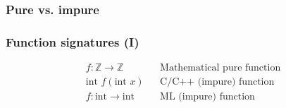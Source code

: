 \begin{frame}
  \frametitle{Pure vs. impure}
  \begin{center}
    \begin{figure}
    \end{figure}
  \end{center}
\end{frame}


\begin{frame}
  \frametitle{Function signatures (I)}
  \begin{align*}
    f : \mathbb{Z} \to \mathbb{Z} && \text{Mathematical pure function}\\
\hline
    \text{int } f(\text{int } x)   && \text{C/C++ (impure) function}\\
    f : \text{int} \to \text{int} && \text{ML (impure) function}
  \end{align*}
\end{frame}

